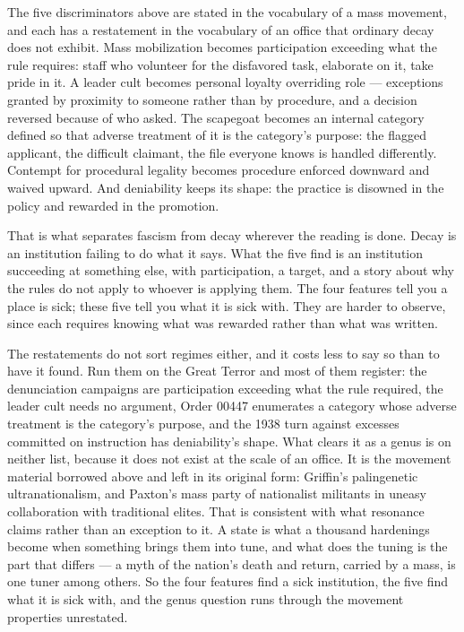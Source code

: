 The five discriminators above are stated in the vocabulary of a mass movement, and each has a restatement in the vocabulary of an office that ordinary decay does not exhibit. Mass mobilization becomes participation exceeding what the rule requires: staff who volunteer for the disfavored task, elaborate on it, take pride in it. A leader cult becomes personal loyalty overriding role — exceptions granted by proximity to someone rather than by procedure, and a decision reversed because of who asked. The scapegoat becomes an internal category defined so that adverse treatment of it is the category's purpose: the flagged applicant, the difficult claimant, the file everyone knows is handled differently. Contempt for procedural legality becomes procedure enforced downward and waived upward. And deniability keeps its shape: the practice is disowned in the policy and rewarded in the promotion.

That is what separates fascism from decay wherever the reading is done. Decay is an institution failing to do what it says. What the five find is an institution succeeding at something else, with participation, a target, and a story about why the rules do not apply to whoever is applying them. The four features tell you a place is sick; these five tell you what it is sick with. They are harder to observe, since each requires knowing what was rewarded rather than what was written.

The restatements do not sort regimes either, and it costs less to say so than to have it found. Run them on the Great Terror and most of them register: the denunciation campaigns are participation exceeding what the rule required, the leader cult needs no argument, Order 00447 enumerates a category whose adverse treatment is the category's purpose, and the 1938 turn against excesses committed on instruction has deniability's shape. What clears it as a genus is on neither list, because it does not exist at the scale of an office. It is the movement material borrowed above and left in its original form: Griffin's palingenetic ultranationalism, and Paxton's mass party of nationalist militants in uneasy collaboration with traditional elites. That is consistent with what resonance claims rather than an exception to it. A state is what a thousand hardenings become when something brings them into tune, and what does the tuning is the part that differs — a myth of the nation's death and return, carried by a mass, is one tuner among others. So the four features find a sick institution, the five find what it is sick with, and the genus question runs through the movement properties unrestated.


